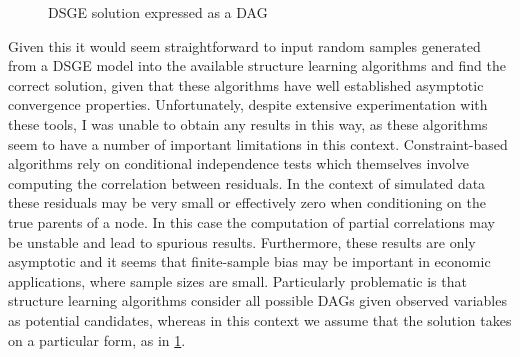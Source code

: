 \documentclass{article}
\begin{document}
\begin{figure}
  \centering
  \caption{DSGE solution expressed as a DAG}
  \label{dsge_dag}
\end{figure}

Given this it would seem straightforward to input random samples generated from a DSGE model into the available structure learning algorithms and find the correct solution, given that these algorithms have well established asymptotic convergence properties. Unfortunately, despite extensive experimentation with these tools, I was unable to obtain any results in this way, as these algorithms seem to have a number of important limitations in this context. Constraint-based algorithms rely on conditional independence tests which themselves involve computing the correlation between residuals. In the context of simulated data these residuals may be very small or effectively zero when conditioning on the true parents of a node. In this case the computation of partial correlations may be unstable and lead to spurious results. Furthermore, these results are only asymptotic and it seems that finite-sample bias may be important in economic applications, where sample sizes are small. Particularly problematic is that structure learning algorithms consider all possible DAGs given observed variables as potential candidates, whereas in this context we assume that the solution takes on a particular form, as in \ref{dsge_dag}.
\end{document}
